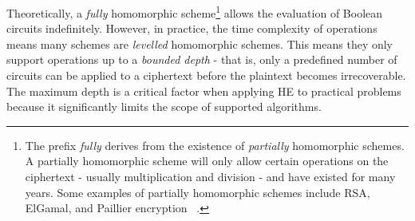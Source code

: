 Theoretically, a \textit{fully} homomorphic scheme\footnote{The prefix \textit{fully} derives from the existence of \textit{partially} homomorphic schemes. A partially homomorphic scheme will only allow certain operations on the ciphertext - usually multiplication and division - and have existed for many years. Some examples of partially homomorphic schemes include RSA, ElGamal, and Paillier encryption ~\cite{PartialSchemes}.} allows the evaluation of Boolean circuits indefinitely. However, in practice, the time complexity of operations means many schemes are \textit{levelled} homomorphic schemes. This means they only support operations up to a \textit{bounded depth} - that is, only a predefined number of circuits can be applied to a ciphertext before the plaintext becomes irrecoverable. The maximum depth is a critical factor when applying HE to practical problems because it significantly limits the scope of supported algorithms.
